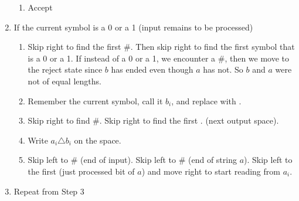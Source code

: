 \documentclass[addpoints,a4paper]{exam}
\begin{document}
\begin{questions}
\begin{parts}
\begin{solution}
\begin{enumerate}
\begin{enumerate}
                \item Accept
              \end{enumerate}
        \item If the current symbol is a 0 or a 1 (input remains to be processed) \vspace*{-1mm} \begin{enumerate}
                \item Skip right to find the first \#. Then skip right to find the first symbol that is a 0 or a 1. If instead of a 0 or a 1, we encounter a \#, then we move to the reject state since $b$ has ended even though $a$ has not. So $ b $ and $ a $ were not of equal lengths. \vspace*{-1mm}
                \item Remember the current symbol, call it $b_i$, and replace with \textvisiblespace\;. \vspace*{-1mm}
                \item Skip right to find \#. Skip right to find the first \textvisiblespace. (next output space). \vspace*{-1mm}
                \item Write $a_i \triangle b_i$ on the space. \vspace*{-1mm}
                \item Skip left to \# (end of input). Skip left to \# (end of string $a$). Skip left to the first \textvisiblespace\; (just processed bit of $a$) and move right to start reading from $a_i$.
              \end{enumerate}
        \item Repeat from Step 3
              

\end{enumerate}
\end{solution}
\end{parts}
\end{questions}
\end{document}
